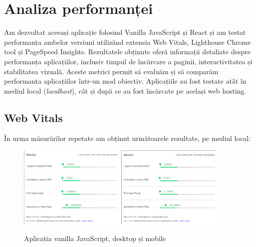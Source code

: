 \documentclass[12pt, a4paper]{report}
\begin{document}
\section{Analiza performanței}

Am dezvoltat aceeași aplicație folosind Vanilla JavaScript și React și am testat performanța ambelor versiuni utilizând extensia Web Vitals, Lighthouse Chrome tool și PageSpeed Insights. Rezultatele obținute oferă informații detaliate despre performanța aplicațiilor, inclusiv timpul de încărcare a paginii, interactivitatea și stabilitatea vizuală. Aceste metrici permit să evaluăm și să comparăm performanța aplicațiilor într-un mod obiectiv. Aplicațiile au fost testate atât în mediul local (\emph{localhost}), cât și după ce au fost încărcate pe același web hosting.

\subsection{Web Vitals}
{}
În urma măsurărilor repetate am obținut următoarele rezultate, pe mediul local:

\begin{figure}[htbp]
	\centering
	\includegraphics[width=0.45\textwidth]{01_desktop.png}
	\includegraphics[width=0.45\textwidth]{01_mobile.png}
	\caption{Aplicația vanilla JavaScript, desktop și mobile}
	\label{fig:01-local}
\end{figure}
\end{document}
